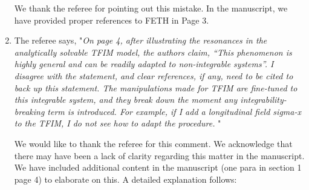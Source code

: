 \documentclass[aps,prb,reprint,showpacs,floatfix,superscriptaddress, onecolumn, nofootinbib, 9pt]{revtex4-2}
\newcommand{\response}[1]{{\color{blue}#1}} %
\begin{document}
\begin{enumerate}
		\response{
			We thank the referee for pointing out this mistake. In the manuscript, we have provided proper references to FETH in Page 3.
		}
		
		\item The referee says, "\textit{On page 4, after illustrating the resonances in the analytically solvable TFIM model, the authors claim, “This phenomenon is highly general and can be readily adapted to non-integrable systems”. I disagree with the statement, and clear references, if any, need to be cited to back up this statement. The manipulations made for TFIM are fine-tuned to this integrable system, and they break down the moment any integrability-breaking term is introduced. For example, if I add a longitudinal field sigma-x to the TFIM, I do not see how to adapt the procedure. }"\\
		\response{ We would like to thank the referee for this comment. We acknowledge that there may have been a lack of clarity regarding this matter in the manuscript. We have included additional content in the manuscript (one para in section 1 page 4) to elaborate on this. A detailed explanation follows:
			
}
\end{enumerate}
\end{document}

